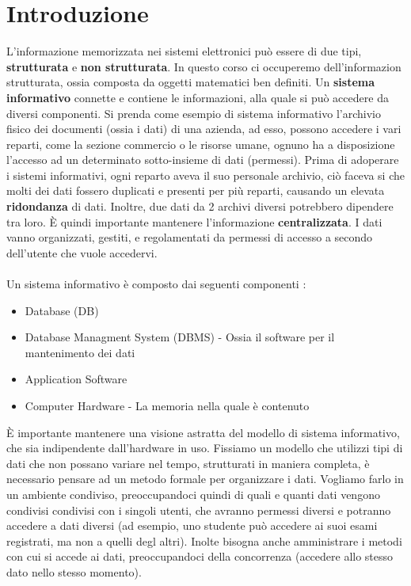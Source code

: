 \documentclass[12pt, letterpaper]{article}
\begin{document}
\section{Introduzione}
L'informazione memorizzata nei sistemi elettronici può essere di due tipi, \textbf{strutturata}
e \textbf{non strutturata}. In questo corso ci occuperemo dell'informazion strutturata, ossia composta da 
oggetti matematici ben definiti. Un \textbf{sistema informativo} connette e contiene le informazioni,
alla quale si può accedere da diversi componenti. Si prenda come esempio di sistema informativo l'archivio
fisico dei documenti (ossia i dati) di una azienda, ad esso, possono accedere i vari reparti, come la sezione 
commercio o le risorse umane, ognuno ha a disposizione l'accesso ad un determinato sotto-insieme di dati (permessi).
Prima di adoperare i sistemi informativi, ogni reparto aveva il suo personale archivio, ciò faceva si che molti dei dati
fossero duplicati e presenti per più reparti, causando un elevata \textbf{ridondanza} di dati. Inoltre, due dati da 2 archivi
diversi potrebbero dipendere tra loro. È quindi importante mantenere l'informazione \textbf{centralizzata}.
I dati vanno organizzati, gestiti, e regolamentati da permessi di accesso a secondo dell'utente che vuole accedervi.
\\\\Un sistema informativo è composto dai seguenti componenti : 
\begin{itemize}
    \item Database (DB)
    \item Database Managment System (DBMS) - Ossia il software per il mantenimento dei dati  
    \item Application Software
    \item Computer Hardware - La memoria nella quale è contenuto
\end{itemize}
È importante mantenere una visione astratta del modello di sistema informativo, che sia indipendente
dall'hardware in uso. Fissiamo un modello che utilizzi tipi di dati che non possano variare nel tempo,
strutturati in maniera completa, è necessario pensare ad un metodo formale per organizzare i dati.
Vogliamo farlo in un ambiente condiviso, preoccupandoci quindi di quali e quanti dati vengono condivisi condivisi
con i singoli utenti, che avranno permessi diversi e potranno accedere a dati diversi (ad esempio, uno studente può
accedere ai suoi esami registrati, ma non a quelli degl altri). Inolte bisogna anche amministrare i metodi
con cui si accede ai dati, preoccupandoci della concorrenza (accedere allo stesso dato nello stesso momento).
\end{document}
